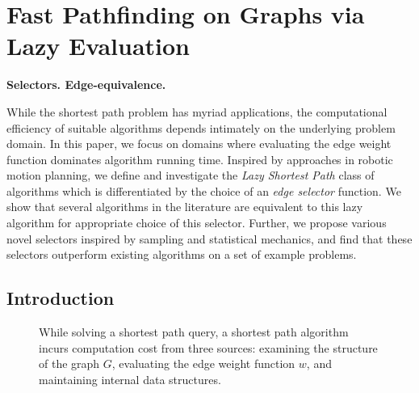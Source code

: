 \chapter{Fast Pathfinding on Graphs via Lazy Evaluation}
\label{chap:lazysp}

{\bf Selectors.
Edge-equivalence.}


While the shortest path problem has myriad applications,
the computational efficiency of suitable algorithms
depends intimately on the underlying problem domain.
In this paper,
we focus on domains where evaluating the edge weight function
dominates algorithm running time.
Inspired by approaches in robotic motion planning,
we define and investigate the \emph{Lazy Shortest Path} class of
algorithms which is differentiated by the choice of
an \emph{edge selector} function.
We show that several algorithms in the literature are equivalent to
this lazy algorithm for appropriate choice of this selector.
Further, we propose various novel selectors inspired by
sampling and statistical mechanics,
and find that these selectors outperform
existing algorithms on a set of example problems.

\section{Introduction}

\begin{figure}
\centering
{}
\caption{While solving a shortest path query,
   a shortest path algorithm incurs computation cost from three sources:
   examining the structure of the graph $G$,
   evaluating the edge weight function $w$,
   and maintaining internal data structures.}
\label{fig:sp-intro}
\end{figure}

